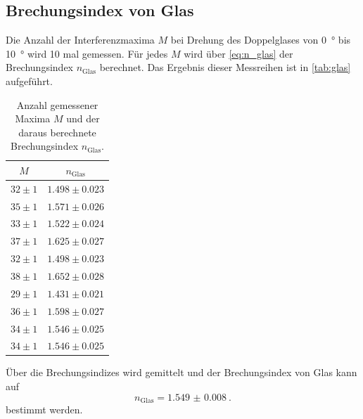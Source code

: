 \subsection{Brechungsindex von Glas}
Die Anzahl der Interferenzmaxima $M$ bei Drehung des Doppelglases von \qty{0}{\degree} bis \qty{10}{\degree} wird 10 mal gemessen.
Für jedes $M$ wird über \autoref{eq:n_glas} der Brechungsindex $n_\text{Glas}$ berechnet.
Das Ergebnis dieser Messreihen ist in \autoref{tab:glas} aufgeführt.
\begin{table}
    \centering
    \caption{Anzahl gemessener Maxima $M$ und der daraus berechnete Brechungsindex $n_\text{Glas}$.}
    \label{tab:glas}
    \begin{tabular}{c c}
        \toprule
        $M$ & $n_\text{Glas}$ \\
        \midrule
        $32 \pm 1 $ & $1.498 \pm 0.023 $ \\
        $35 \pm 1 $ & $1.571 \pm 0.026 $ \\
        $33 \pm 1 $ & $1.522 \pm 0.024 $ \\
        $37 \pm 1 $ & $1.625 \pm 0.027 $ \\
        $32 \pm 1 $ & $1.498 \pm 0.023 $ \\
        $38 \pm 1 $ & $1.652 \pm 0.028 $ \\
        $29 \pm 1 $ & $1.431 \pm 0.021 $ \\
        $36 \pm 1 $ & $1.598 \pm 0.027 $ \\
        $34 \pm 1 $ & $1.546 \pm 0.025 $ \\
        $34 \pm 1 $ & $1.546 \pm 0.025 $ \\
        \bottomrule
    \end{tabular}
\end{table}
Über die Brechungsindizes wird gemittelt und der Brechungsindex von Glas kann auf
\begin{equation*}
    n_\text{Glas} = \qty{1.549(8)}{}.
\end{equation*}
bestimmt werden.
\FloatBarrier

